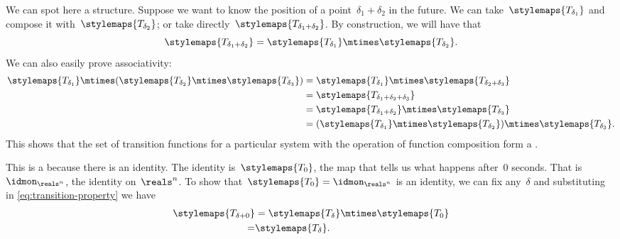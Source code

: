 We can spot here a  structure.
Suppose we want to know the position of a point~$\delta_1 + \delta_2$
in the future.
We can take~$\stylemaps{T_{\delta_1}}$ and compose it with~$\stylemaps{T_{\delta_2}}$; or take directly~$\stylemaps{T_{\delta_1 + \delta_2}}$.
By construction, we will have that
\begin{equation}
    \label{eq:transition-property}
    \stylemaps{T_{\delta_1 + \delta_2}} = \stylemaps{T_{\delta_1}} \mtimes \stylemaps{T_{\delta_2}}.
\end{equation}
We can also easily prove associativity:
\begin{equation}
    \begin{aligned}
        \stylemaps{T_{\delta_1}}\mtimes (\stylemaps{T_{\delta_2}}\mtimes \stylemaps{T_{\delta_3}}) & =\stylemaps{T_{\delta_1}}\mtimes \stylemaps{T_{\delta_2+\delta_3}} \\
                                                                                                   & =\stylemaps{T_{\delta_1+\delta_2+\delta_3}} \\
                                                                                                   & =\stylemaps{T_{\delta_1+\delta_2}}\mtimes \stylemaps{T_{\delta_3}} \\
                                                                                                   & =(\stylemaps{T_{\delta_1}}\mtimes \stylemaps{T_{\delta_2}})\mtimes \stylemaps{T_{\delta_3}}.
    \end{aligned}
\end{equation}
%
This shows that the set of transition functions for a particular system with the operation of function composition form a .

This  is a  because there is an identity.
The identity is~$\stylemaps{T_0}$, the map that tells us what happens after~$0$ seconds.
That is~$\idmon_{\reals^n}$, the identity on~$\reals^n$.
To show that~$\stylemaps{T_0} = \idmon_{\reals^n}$ is an identity, we can fix any~$\delta$ and substituting in \cref{eq:transition-property} we have
\begin{equation}
    \begin{aligned}
        \stylemaps{T_{\delta + 0}} & = \stylemaps{T_{\delta}} \mtimes \stylemaps{T_{0}} \\
        =                          & \stylemaps{T_{\delta}}.
    \end{aligned}
\end{equation}

